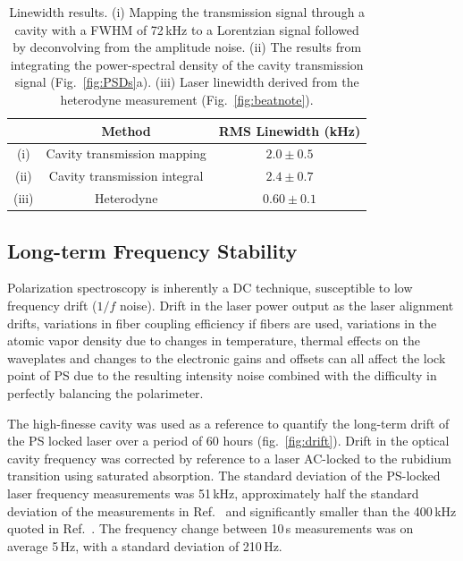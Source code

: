 \documentclass[10pt,letterpaper]{article}
\begin{document}
\begin{table}[htbp]
\centering
\begin{tabular}{c c c}
\hline
  & Method & RMS Linewidth (kHz) \\ \hline
  (i) & Cavity transmission mapping  & $2.0 \pm 0.5$ \\
  (ii) &Cavity transmission integral & $2.4 \pm 0.7$ \\
  (iii) & Heterodyne & $0.60\pm0.1$ \\ \hline\end{tabular}
\caption{Linewidth results.
(i) Mapping the transmission signal through a cavity with a FWHM of 72\,kHz to a Lorentzian signal followed by deconvolving from the amplitude noise.
(ii) The results from integrating the power-spectral density of the cavity transmission signal (Fig.~\ref{fig:PSDs}a).
(iii) Laser linewidth derived from the heterodyne measurement (Fig.~\ref{fig:beatnote}).}
\label{linewidth_table}
\end{table}

\subsection{Long-term Frequency Stability}
Polarization spectroscopy is inherently a DC technique, susceptible to low frequency drift ($1/f$ noise).
Drift in the laser power output as the laser alignment drifts, variations in fiber coupling efficiency if fibers are used, variations in the atomic vapor density due to changes in temperature, thermal effects on the waveplates and changes to the electronic gains and offsets can all affect the lock point of PS due to the resulting intensity noise combined with the difficulty in perfectly balancing the polarimeter.

The high-finesse cavity was used as a reference to quantify the long-term drift of the PS locked laser over a period of 60 hours (fig.~\ref{fig:drift}).
Drift in the optical cavity frequency was corrected by reference to a laser AC-locked to the rubidium transition using saturated absorption.
The standard deviation of the PS-locked laser frequency measurements was 51\,kHz, approximately half the standard deviation of the measurements in Ref.~\cite{tiwari_laser_2006} and significantly smaller than the 400\,kHz quoted in Ref.~\cite{lee_frequency_2014}.
The frequency change between 10\,s measurements was on average 5\,Hz, with a standard deviation of 210\,Hz.
\end{document}
